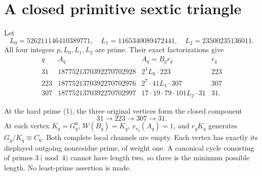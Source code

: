 \section{A closed primitive sextic triangle}
Let
\[
 L_0=526211146410389771,\quad L_1=1165340089472441,\quad
 L_2=23500235136011.
\]
All four integers $p,L_0,L_1,L_2$ are prime. Their exact factorizations give
\[
\begin{array}{c|r|l|c}
 q&A_q& A_q=B_q r_q&r_q\\\hline
31&1877521370392270702928&2^4L_0\cdot223&223\\
223&1877521370392270702976&2^7\cdot41L_1\cdot307&307\\
307&1877521370392270702997&17\cdot19\cdot79\cdot101L_2\cdot31&31.
\end{array}                                                   \tag{6}
\]
\begin{theorem}\label{thm:triangle}
At the hard prime (1), the three original vertices form the closed component
\[
 \boxed{31\longrightarrow223\longrightarrow307\longrightarrow31.} \tag{7}
\]
At each vertex $K_q=G_q^6$, $W(B_q)=K_q$, $v_{r_q}(A_q)=1$, and $r_qK_q$
generates $G_q/K_q\cong C_6$. Both complete local channels are empty.
Each vertex has exactly its displayed outgoing nonresidue prime, of weight one.
A canonical cycle consisting of primes $3\pmod4$ cannot have length two, so
three is the minimum possible length. No least-prime assertion is made.
\end{theorem}

